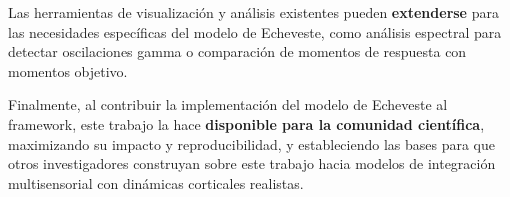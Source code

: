Las herramientas de visualización y análisis existentes pueden \textbf{extenderse} para las necesidades específicas del modelo de Echeveste, como análisis espectral para detectar oscilaciones gamma o comparación de momentos de respuesta con momentos objetivo.

Finalmente, al contribuir la implementación del modelo de Echeveste al framework, este trabajo la hace \textbf{disponible para la comunidad científica}, maximizando su impacto y reproducibilidad, y estableciendo las bases para que otros investigadores construyan sobre este trabajo hacia modelos de integración multisensorial con dinámicas corticales realistas.